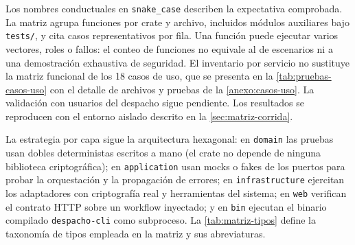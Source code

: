 Los nombres conductuales en \texttt{snake\_case} describen la expectativa comprobada. La matriz agrupa funciones por crate y archivo, incluidos módulos auxiliares bajo \texttt{tests/}, y cita casos representativos por fila. Una función puede ejecutar varios vectores, roles o fallos: el conteo de funciones no equivale al de escenarios ni a una demostración exhaustiva de seguridad. El inventario por servicio no sustituye la matriz funcional de los 18 casos de uso, que se presenta en la \cref{tab:pruebas-casos-uso} con el detalle de archivos y pruebas de la \cref{anexo:casos-uso}. La validación con usuarios del despacho sigue pendiente. Los resultados se reproducen con el entorno aislado descrito en la \cref{sec:matriz-corrida}.

La estrategia por capa sigue la arquitectura hexagonal: en \texttt{domain} las pruebas usan dobles deterministas escritos a mano (el crate no depende de ninguna biblioteca criptográfica); en \texttt{application} usan mocks o fakes de los puertos para probar la orquestación y la propagación de errores; en \texttt{infrastructure} ejercitan los adaptadores con criptografía real y herramientas del sistema; en \texttt{web} verifican el contrato HTTP sobre un workflow inyectado; y en \texttt{bin} ejecutan el binario compilado \texttt{despacho-cli} como subproceso. La \cref{tab:matriz-tipos} define la taxonomía de tipos empleada en la matriz y sus abreviaturas.

